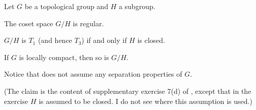 \documentclass[article, a4paper, 11pt, oneside]{memoir}
\numberwithin{equation}{chapter}
\begin{document}
\begin{proposition}
    Let $G$ be a topological group and $H$ a subgroup.
    \begin{enumprop}
        \item \label{enum:coset_space_regular} The coset space $G/H$ is regular.
        
        \item \label{enum:coset_space_T1} $G/H$ is $T_1$ (and hence $T_3$) if and only if $H$ is closed.
        
        \item \label{enum:coset_space_locally_compact} If $G$ is locally compact\footnotemark, then so is $G/H$.
    \end{enumprop}
\end{proposition}
%
Notice that  does not assume any separation properties of $G$.

(The claim  is the content of supplementary exercise 7(d) of \textcite[Chapter~2]{munkres}, except that in the exercise $H$ is assumed to be closed. I do not see where this assumption is used.)
\end{document}
